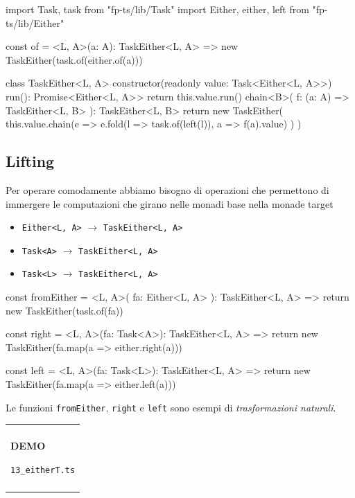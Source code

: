 \documentclass[12pt]{article}
\theoremstyle{definition}
\newenvironment{demo}
    {\begin{center}
    \begin{tabular}{|p{0.9\textwidth}|}
    \hline\\
    }
    {
    \\\\\hline
    \end{tabular}
    \end{center}
    }
\newenvironment{code}
  {\vspace{0.5cm} \VerbatimEnvironment\begin{typescriptcode}}
  {\end{typescriptcode} \vspace{0.2cm}}
\begin{document}
\begin{code}
import { Task, task } from "fp-ts/lib/Task"
import { Either, either, left } from "fp-ts/lib/Either"

const of = <L, A>(a: A): TaskEither<L, A> =>
  new TaskEither(task.of(either.of(a)))

class TaskEither<L, A> {
  constructor(readonly value: Task<Either<L, A>>) {}
  run(): Promise<Either<L, A>> {
    return this.value.run()
  }
  chain<B>(
    f: (a: A) => TaskEither<L, B>
  ): TaskEither<L, B> {
    return new TaskEither(
      this.value.chain(e =>
        e.fold(l => task.of(left(l)), a => f(a).value)
      )
    )
  }
}
\end{code}

\subsection{Lifting}

Per operare comodamente abbiamo bisogno di operazioni che permettono di immergere le computazioni che girano
nelle monadi base nella monade target

\begin{itemize}
\item \texttt{Either<L, A>} $\rightarrow$ \texttt{TaskEither<L, A>}
\item \texttt{Task<A>} $\rightarrow$ \texttt{TaskEither<L, A>}
\item \texttt{Task<L>} $\rightarrow$ \texttt{TaskEither<L, A>}
\end{itemize}

\begin{code}
const fromEither = <L, A>(
  fa: Either<L, A>
): TaskEither<L, A> => {
  return new TaskEither(task.of(fa))
}

const right = <L, A>(fa: Task<A>): TaskEither<L, A> => {
  return new TaskEither(fa.map(a => either.right(a)))
}

const left = <L, A>(fa: Task<L>): TaskEither<L, A> => {
  return new TaskEither(fa.map(a => either.left(a)))
}
\end{code}

Le funzioni \texttt{fromEither}, \texttt{right} e \texttt{left} sono esempi di \emph{trasformazioni naturali}.

\begin{demo}
\begin{center}
\textbf{DEMO}

\texttt{13\_eitherT.ts}
\end{center}
\end{demo}
\end{document}
